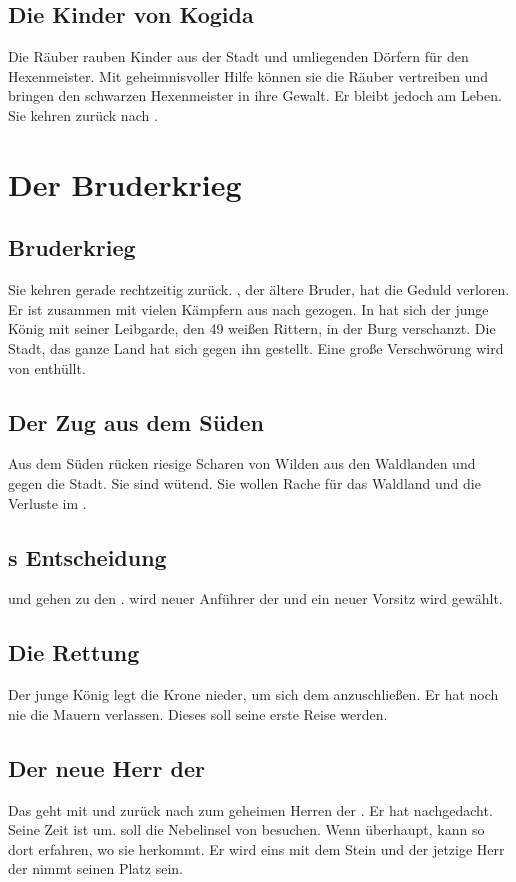 \documentclass[12pt,a4paper,onecolumn,oneside,ngerman]{book}
\begin{document}
\chapter{Die Kinder von Kogida}
Die Räuber rauben Kinder aus der Stadt {\Kogida} und umliegenden Dörfern für den Hexenmeister. Mit geheimnisvoller Hilfe können sie die Räuber vertreiben und bringen den schwarzen Hexenmeister {\Denner} in ihre Gewalt. Er bleibt jedoch am Leben. Sie kehren zurück nach {\Rhin}.

\part{Der Bruderkrieg}
\chapter{Bruderkrieg}
Sie kehren gerade rechtzeitig zurück. {\Kalemus}, der ältere Bruder, hat die Geduld verloren. Er ist zusammen mit vielen Kämpfern aus {\Toris} nach {\Rhin} gezogen. In {\Rhingell} hat sich der junge König mit seiner Leibgarde, den 49 weißen Rittern, in der Burg verschanzt. Die Stadt, das ganze Land hat sich gegen ihn gestellt.\linebreak
Eine große Verschwörung wird von {\Nox} enthüllt.

\chapter{Der Zug aus dem Süden}
Aus dem Süden rücken riesige Scharen von Wilden aus den Waldlanden und {\Bangiri} gegen die Stadt. Sie sind wütend. Sie wollen Rache für das Waldland und die Verluste im {\Enland}.

\chapter{{\Eno}s Entscheidung}
{\Eno} und {\Papato} gehen zu den {\Bangiri}.\linebreak
{\Nox} wird neuer Anführer der {\Schattenlaufer} und ein neuer Vorsitz wird gewählt.

\chapter{Die Rettung }
Der junge König {\Palemus} legt die Krone nieder, um sich dem {\Sena} anzuschließen. Er hat noch nie die Mauern  verlassen. Dieses soll seine erste Reise werden.

\chapter{Der neue Herr der {\Eisenmeister}}
Das {\Sturmkind} geht mit {\Safir} und {\Umbra} zurück nach {\Abaton} zum geheimen Herren der {\Eisenmeister}.\linebreak
Er hat nachgedacht. Seine Zeit ist um. {\Sena} soll die Nebelinsel von \Darmon besuchen. Wenn überhaupt, kann so dort erfahren, wo sie herkommt. Er wird eins mit dem Stein und der jetzige Herr der {\Eisenmeister} nimmt seinen Platz sein.
\end{document}
